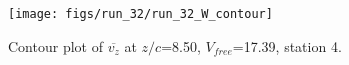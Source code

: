 \begin{figure}[H]
\centering
\texttt{[image: figs/run\_32/run\_32\_W\_contour]}
\caption{Contour plot of $\overline{v_{z}}$ at $z/c$=8.50, $V_{free}$=17.39, station 4.}
\label{fig:run_32_W_contour}
\end{figure}


